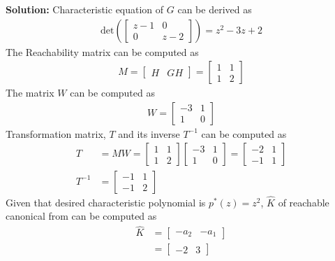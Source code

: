 \documentclass[twoside]{article}
\begin{document}
\textbf{Solution:} Characteristic equation of $G$ can be derived as
%
\begin{align*}
 \mathrm{det} \left(  \left[ \begin{array}{cc} z-1 & 0 \\ 0 &
                                                              z-2 \end{array} \right]  \right)
 = z^2 - 3 z + 2
\end{align*}
%
The Reachability matrix can be computed as
%
\begin{align*}
  M = \left[ \begin{array}{c|c} H & G H \end{array} \right] = \left[ \begin{array}{cc} 1 & 1 \\ 1 & 2 \end{array} \right]
\end{align*}
%
The matrix $W$ can be computed as
%
\begin{align*}
  W =  \left[ \begin{array}{cc} -3 & 1 \\ 1 & 0 \end{array} \right]
\end{align*}
%
Transformation matrix, $T$ and its inverse $T^{-1}$ can be computed 
as
\begin{align*}
  T &= M W =  
\left[ \begin{array}{cc} 1 & 1 \\ 1 & 2 \end{array} \right]
\left[ \begin{array}{cc} -3 & 1 \\ 1 & 0 \end{array} \right]
= \left[ \begin{array}{cc} -2 & 1 \\ -1 & 1 \end{array} \right]
\\
T^{-1} &= \left[ \begin{array}{cc} -1 & 1 \\ -1 & 2 \end{array} \right]
\end{align*}
%
Given that desired characteristic polynomial is $p^*(z) = z^2$,
$\hat{K}$ of reachable canonical from can be computed as
%
\begin{align*}
  \hat{K} &= \left[ \begin{array}{cc} - a_2 & -
                                                       a_1 \end{array}
                                                       \right]
\\
&= \left[ \begin{array}{ccc} -2 & 3 \end{array}
                                                       \right]
\end{align*}
\end{document}
